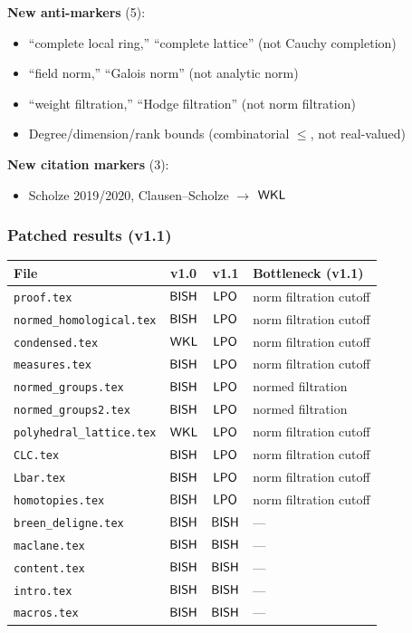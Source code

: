 \noindent\textbf{New anti-markers} (5):

\begin{itemize}[nosep]
\item ``complete local ring,'' ``complete lattice'' (not Cauchy completion)
\item ``field norm,'' ``Galois norm'' (not analytic norm)
\item ``weight filtration,'' ``Hodge filtration'' (not norm filtration)
\item Degree/dimension/rank bounds (combinatorial $\leq$, not real-valued)
\end{itemize}

\noindent\textbf{New citation markers} (3):

\begin{itemize}[nosep]
\item Scholze 2019/2020, Clausen--Scholze $\to$ $\textsf{WKL}$
\end{itemize}

\subsubsection{Patched results (v1.1)}\label{sec:patched-results}

\begin{center}
\begin{tabular}{lccl}
\toprule
\textbf{File} & \textbf{v1.0} & \textbf{v1.1} & \textbf{Bottleneck (v1.1)} \\
\midrule
\texttt{proof.tex}              & $\textsf{BISH}$ & $\textsf{LPO}$ & norm filtration cutoff \\
\texttt{normed\_homological.tex} & $\textsf{BISH}$ & $\textsf{LPO}$ & norm filtration cutoff \\
\texttt{condensed.tex}          & $\textsf{WKL}$  & $\textsf{LPO}$ & norm filtration cutoff \\
\texttt{measures.tex}           & $\textsf{BISH}$ & $\textsf{LPO}$ & norm filtration cutoff \\
\texttt{normed\_groups.tex}     & $\textsf{BISH}$ & $\textsf{LPO}$ & normed filtration \\
\texttt{normed\_groups2.tex}    & $\textsf{BISH}$ & $\textsf{LPO}$ & normed filtration \\
\texttt{polyhedral\_lattice.tex}& $\textsf{WKL}$  & $\textsf{LPO}$ & norm filtration cutoff \\
\texttt{CLC.tex}                & $\textsf{BISH}$ & $\textsf{LPO}$ & norm filtration cutoff \\
\texttt{Lbar.tex}               & $\textsf{BISH}$ & $\textsf{LPO}$ & norm filtration cutoff \\
\texttt{homotopies.tex}         & $\textsf{BISH}$ & $\textsf{LPO}$ & norm filtration cutoff \\
\texttt{breen\_deligne.tex}     & $\textsf{BISH}$ & $\textsf{BISH}$ & --- \\
\texttt{maclane.tex}            & $\textsf{BISH}$ & $\textsf{BISH}$ & --- \\
\texttt{content.tex}            & $\textsf{BISH}$ & $\textsf{BISH}$ & --- \\
\texttt{intro.tex}              & $\textsf{BISH}$ & $\textsf{BISH}$ & --- \\
\texttt{macros.tex}             & $\textsf{BISH}$ & $\textsf{BISH}$ & --- \\
\bottomrule
\end{tabular}
\end{center}

